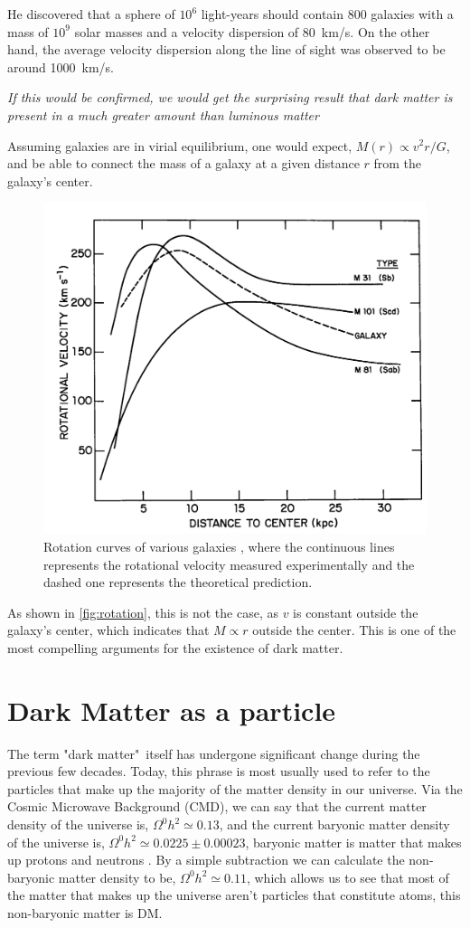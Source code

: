 He discovered that a sphere of $10^6$ light-years should contain 800 galaxies with a mass of $10^9$ solar masses and a velocity dispersion of \SI{80}{\km/\s}.
On the other hand, the average velocity dispersion along the line of sight was observed to be around \SI{1000}{\km/\s}.

\textit{If this would be confirmed, we would get the surprising result that dark matter is present in a much greater amount than luminous matter}

Assuming galaxies are in virial equilibrium, one would expect, $M(r) \propto v^2r/G$, and  be able to connect the mass of a galaxy at a given distance $r$ from the galaxy's center.

\begin{figure}[H]
	\centering
	\includegraphics[width=0.6\linewidth]{graphs/rotation-curves}
	\caption{Rotation curves of various galaxies \cite{1973rotationcurves}, where the continuous lines represents the rotational velocity measured experimentally and the dashed one  represents the theoretical prediction.}
	\label{fig:rotation}
\end{figure}

As shown in \autoref{fig:rotation}, this is not the case, as $v$ is constant outside the galaxy's center, which indicates that $M \propto r$ outside the center.
This is one of the most compelling arguments for the existence of dark matter. 

\section{Dark Matter as a particle}

The term "dark matter"\ itself has undergone significant change during the previous few decades.
Today, this phrase is most usually used to refer to the particles that make up the majority of the matter density in our universe. Via the Cosmic Microwave Background (CMD), we can say that the current matter density of the universe is, $\Omega^0h^2\simeq0.13$, and the current baryonic matter density of the universe is, $\Omega^0h^2\simeq0.0225\pm0.00023$, baryonic matter is matter that makes up protons and neutrons \cite{2020}. By a simple subtraction we can calculate the non-baryonic matter density to be, $\Omega^0h^2\simeq0.11$, which allows us to see that most of the matter that makes up the universe aren't particles that constitute atoms, this non-baryonic matter is DM.

